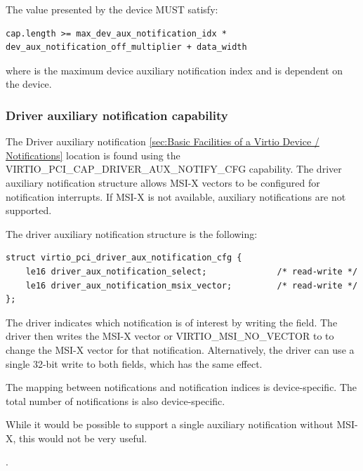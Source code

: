 The value  presented by the device MUST satisfy:

\begin{lstlisting}
cap.length >= max_dev_aux_notification_idx * dev_aux_notification_off_multiplier + data_width
\end{lstlisting}

where  is the maximum device
auxiliary notification index and is dependent on the device.

\subsubsection{Driver auxiliary notification capability}\label{sec:Virtio Transport Options / Virtio Over PCI Bus / PCI Device Layout / Driver auxiliary notification capability}

The Driver auxiliary notification
\ref{sec:Basic Facilities of a Virtio Device / Notifications} location
is found using the VIRTIO_PCI_CAP_DRIVER_AUX_NOTIFY_CFG capability. The
driver auxiliary notification structure allows MSI-X vectors to be
configured for notification interrupts. If MSI-X is not
available, auxiliary notifications are not supported.

The driver auxiliary notification structure is the following:

\begin{lstlisting}
struct virtio_pci_driver_aux_notification_cfg {
	le16 driver_aux_notification_select;              /* read-write */
	le16 driver_aux_notification_msix_vector;         /* read-write */
};
\end{lstlisting}

The driver indicates which notification is of interest by writing the
 field. The driver then writes the MSI-X
vector or VIRTIO_MSI_NO_VECTOR to  to
change the MSI-X vector for that notification. Alternatively, the driver can
use a single 32-bit write to both fields, which has the same effect.

The mapping between notifications and notification indices is device-specific.
The total number of notifications is also device-specific.

\begin{note}
While it would be possible to support a single auxiliary
notification without MSI-X, this would not be very useful.
\end{note}.

